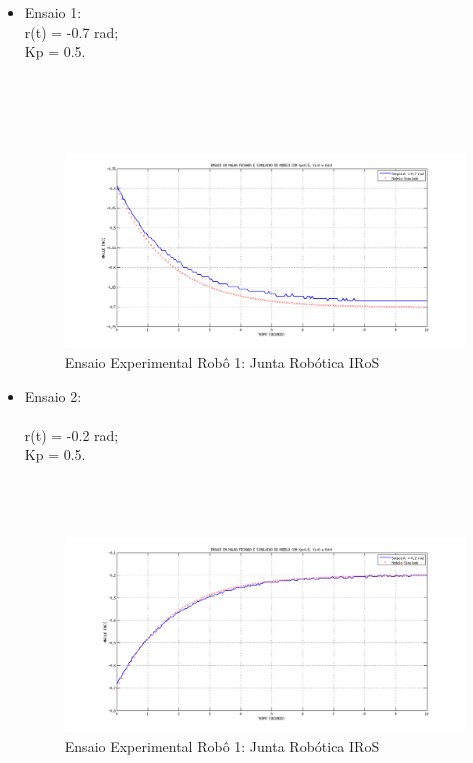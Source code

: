 \documentclass[12pt,oneside,a4paper, chapter=TITLE, section = TITLE, english, brazil]{abntex2}
\begin{document}
\begin{itemize}

\item Ensaio 1:
\\
r(t) = -0.7 rad;\\
Kp = 0.5.\\
\\
\\
\\
\\

\begin{figure}[h] %
\centering
\includegraphics[scale=0.43]{./imagens/Simu1_1_robo}
\caption[Ensaio Experimental Robô 1: Junta Robótica IRoS]{Ensaio Experimental Robô 1: Junta Robótica IRoS}
\label{fig:simu1_1_robo}
\end{figure}

\item Ensaio 2:
\\
\\
r(t) = -0.2 rad;\\
Kp = 0.5.\\
\\
\\
\\

\begin{figure}[h] %
\centering
\includegraphics[scale=0.43]{./imagens/Simu1_2_robo}
\caption[Ensaio Experimental Robô 1: Junta Robótica IRoS]{Ensaio Experimental Robô 1: Junta Robótica IRoS}
\label{fig:simu1_2_robo}
\end{figure}



\end{itemize}
\end{document}
